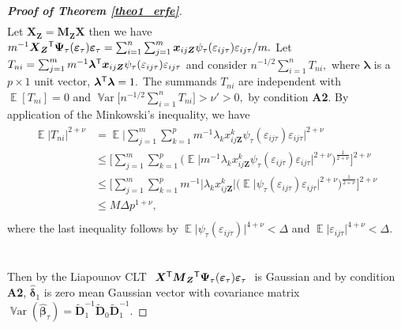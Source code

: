 \documentclass[15pt,a4paper]{article}
\DeclareMathOperator{\Var}{\mathbb{V}\text{ar}}
\DeclareMathOperator{\E}{\mathbb{E}}
\newcommand{\transpose}{{}^{\text{\sffamily T}}}
\begin{document}
\begin{proof}[\textbf{Proof of Theorem \ref{theo1_erfe}}]
\begin{equation}
\begin{split}
\end{split}
\end{equation}
Let $\boldsymbol{X}_{\boldsymbol{Z}}=\boldsymbol{M}_{\boldsymbol{Z}}\boldsymbol{X}$ then we have $ m^{-1}\boldsymbol{X}_{\boldsymbol{Z}}\transpose\boldsymbol{\Psi}_\tau(\boldsymbol{\varepsilon}_{\tau})\boldsymbol{\varepsilon}_{\tau}= \sum_{i=1}^{n}\sum_{j=1}^{m}\boldsymbol{x}_{ij\boldsymbol{Z}}\psi_\tau(\varepsilon_{ij\tau})\varepsilon_{ij\tau}/m.$ Let $T_{ni}=\sum_{j=1}^{m}m^{-1}\boldsymbol{\lambda}\transpose\boldsymbol{x}_{ij\boldsymbol{Z}}\psi_\tau(\varepsilon_{ij\tau})\varepsilon_{ij\tau}$
and consider $n^{-1/2}\sum_{i=1}^{n}T_{ni},$ where $\boldsymbol{\lambda}$ is a $p\times 1$ unit vector, $\boldsymbol{\lambda}\transpose\boldsymbol{\lambda}=1.$
The summands $T_{ni}$ are independent with $\E[T_{ni}]=0$ and $\Var\Big[n^{-1/2}\sum_{i=1}^{n}T_{ni}\Big]>\nu\prime>0,$ by condition \textbf{A2}. By application of the Minkowski's inequality, we have
\begin{align*}
\begin{split}
 \E\lvert T_{ni} \rvert^{2+\nu} & = \E\bigg\lvert \sum_{j=1}^{m}\sum_{k=1}^{p} m^{-1}\lambda_{k} x_{ij\boldsymbol{Z}}^{k} \psi_{\tau}(\varepsilon_{ij\tau})\varepsilon_{ij\tau} \bigg\rvert^{2+\nu} \\
& \leq \bigg[\sum_{j=1}^{m}\sum_{k=1}^{p}\bigg(\E\Big\lvert m^{-1} \lambda_{k}x_{ij\boldsymbol{Z}}^{k}\psi_{\tau}(\varepsilon_{ij\tau})\varepsilon_{ij\tau}\Big\rvert^{2+\nu}\bigg)^{\frac{1}{2+\nu}} \bigg]^{2+\nu}\\
& \leq \bigg[\sum_{j=1}^{m}\sum_{k=1}^{p} m^{-1} \lvert \lambda_{k}x_{ij\boldsymbol{Z}}^{k} \rvert
\bigg(\E\Big\lvert\psi_{\tau}(\varepsilon_{ij\tau})\varepsilon_{ij\tau}\Big\rvert^{2+\nu}\bigg)^{\frac{1}{2+\nu}} \bigg]^{2+\nu}\\
& \leq M \Delta p^{1+\nu}, \\
\end{split}
\end{align*}
where the last inequality follows by $\E\lvert \psi_{\tau}(\varepsilon_{ij\tau})\rvert^{4+\nu}<\Delta$ and $\E\lvert \varepsilon_{ij\tau} \rvert^{4+\nu}<\Delta.$
~~\\
~~\\
Then by the Liapounov CLT $\ \boldsymbol{X}\transpose\boldsymbol{M}_{\boldsymbol{Z}}\transpose\boldsymbol{\Psi}_\tau(\boldsymbol{\varepsilon}_{\tau})\boldsymbol{\varepsilon}_{\tau}\ $ is Gaussian and by condition \textbf{A2}, $\widehat{\boldsymbol{\delta}}_{1}$ is zero mean Gaussian vector with covariance matrix $\Var(\widehat{\boldsymbol{\beta}}_{\tau})=\widetilde{\boldsymbol{D}}_1^{-1}\widetilde{\boldsymbol{D}}_0\widetilde{\boldsymbol{D}}_1^{-1}.$
\end{proof}
\end{document}
